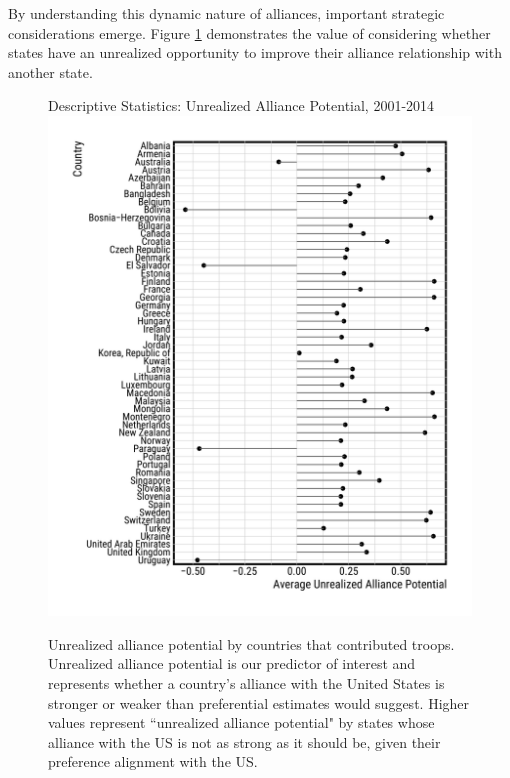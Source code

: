 \documentclass[12pt,letterpaper]{article}
\begin{document}
		
		By understanding this dynamic nature of alliances, important strategic considerations emerge. Figure \ref{fig:measure_comparison_alliances} demonstrates the value of considering whether states have an unrealized opportunity to improve their alliance relationship with another state.

		\newpage
		\begin{figure}[H]
			\begin{center}
			Descriptive Statistics: Unrealized Alliance Potential, 2001-2014
			\vspace{-1em}
			\hspace{-5em}\includegraphics[height = 0.9\textheight]{figures/descriptive_stats.pdf}
			\caption{Unrealized alliance potential by countries that contributed troops. Unrealized alliance potential is our predictor of interest and represents whether a country's alliance with the United States is stronger or weaker than preferential estimates would suggest. Higher values represent ``unrealized alliance potential" by states whose alliance with the US is not as strong as it should be, given their preference alignment with the US.}
			\label{fig:measure_comparison_alliances}
			\end{center}
		\end{figure}
		\newpage
		
\end{document}
